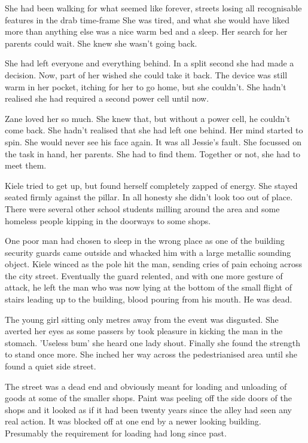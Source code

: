 She had been walking for what seemed like forever, streets losing all recognisable features in the drab time-frame  She was tired, and what she would have liked more than anything else was a nice warm bed and a sleep.  Her search for her parents could wait.  She knew she wasn't going back.  

She had left everyone and everything behind.  In a split second she had made a decision.  Now, part of her wished she could take it back.  The device was still warm in her pocket, itching for her to go home, but she couldn't.  She hadn't realised she had required a second power cell until now.

Zane loved her so much.  She knew that, but without a power cell, he couldn't come back.  She hadn't realised that she had left one behind.  Her mind started to spin.  She would never see his face again.  It was all Jessie's fault.  She focussed on the task in hand, her parents.  She had to find them.  Together or not, she had to meet them.

Kiele tried to get up, but found herself completely zapped of energy.  She stayed seated firmly against the pillar.  In all honesty she didn't look too out of place.  There were several other school students milling around the area and some homeless people kipping in the doorways to some shops.  

One poor man had chosen to sleep in the wrong place as one of the building security guards came outside and whacked him with a large metallic sounding object.  Kiele winced as the pole hit the man, sending cries of pain echoing across the city street.  Eventually the guard relented, and with one more gesture of attack, he left the man who was now lying at the bottom of the small flight of stairs leading up to the building, blood pouring from his mouth.  He was dead.

The young girl sitting only metres away from the event was disgusted.  She averted her eyes as some passers by took pleasure in kicking the man in the stomach.  'Useless bum' she heard one lady shout.  Finally she found the strength to stand once more.  She inched her way across the pedestrianised area until she found a quiet side street.

The street was a dead end and obviously meant for loading and unloading of goods at some of the smaller shops.  Paint was peeling off the side doors of the shops and it looked as if it had been twenty years since the alley had seen any real action.  It was blocked off at one end by a newer looking building.  Presumably the requirement for loading had long since past.

